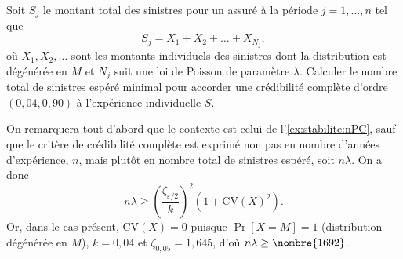 \begin{exercice}
  Soit $S_j$ le montant total des sinistres pour un assuré à la
  période $j = 1, \dots, n$ tel que
  \begin{displaymath}
    S_j = X_1 + X_2 + \dots + X_{N_j},
  \end{displaymath}
  où $X_1, X_2, \dots$ sont les montants individuels des sinistres
  dont la distribution est dégénérée en $M$ et $N_j$ suit une loi de
  Poisson de paramètre $\lambda$. Calculer le nombre total de
  sinistres espéré minimal pour accorder une crédibilité complète
  d'ordre $(0,04, 0,90)$ à l'expérience individuelle $\bar{S}$.
  \begin{rep}
  \end{rep}
  \begin{sol}
    On remarquera tout d'abord que le contexte est celui de
    l'\autoref{ex:stabilite:nPC}, sauf que le critère de crédibilité
    complète est exprimé non pas en nombre d'années d'expérience, $n$,
    mais plutôt en nombre total de sinistres espéré, soit $n \lambda$.
    On a donc
    \begin{displaymath}
      n \lambda \geq
      \left(
        \frac{\zeta_{\varepsilon/2}}{k}
      \right)^2
      (1 + \mathrm{CV}(X)^2).
    \end{displaymath}
    Or, dans le cas présent, $\mathrm{CV}(X) = 0$ puisque $\Pr[X = M]
    = 1$ (distribution dégénérée en $M$), $k = 0,04$ et $\zeta_{0,05}
    = 1,645$, d'où $n \lambda \geq \nombre{1692}$.
  \end{sol}
\end{exercice}

